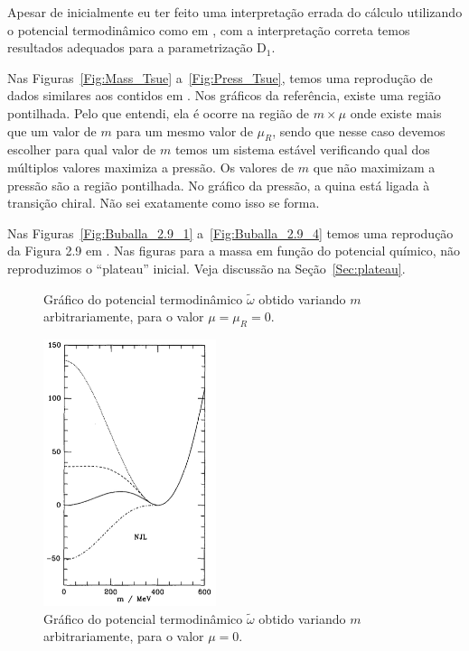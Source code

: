 Apesar de inicialmente eu ter feito uma interpretação errada do cálculo utilizando o potencial termodinâmico como em \textcite{Buballa1996}, com a interpretação correta temos resultados adequados para a parametrização D$_1$.

Nas Figuras~\ref{Fig:Mass_Tsue} a~\ref{Fig:Press_Tsue}, temos uma reprodução de dados similares aos contidos em \textcite{japoneses2}. Nos gráficos da referência, existe uma região pontilhada. Pelo que entendi, ela é ocorre na região de $m \times \mu$ onde existe mais que um valor de $m$ para um mesmo valor de $\mu_R$, sendo que nesse caso devemos escolher para qual valor de $m$ temos um sistema estável verificando qual dos múltiplos valores maximiza a pressão. Os valores de $m$ que não maximizam a pressão são a região pontilhada. No gráfico da pressão, a quina está ligada à transição chiral. Não sei exatamente como isso se forma.

Nas Figuras~\ref{Fig:Buballa_2.9_1} a~\ref{Fig:Buballa_2.9_4} temos uma reprodução da Figura 2.9 em \textcite{Buballa}. Nas figuras para a massa em função do potencial químico, não reproduzimos o ``plateau'' inicial. Veja discussão na Seção~\ref{Sec:plateau}.


\begin{figure}
	
	\caption{Gráfico do potencial termodinâmico $\tilde{\omega}$ obtido variando $m$ arbitrariamente, para o valor $\mu = \mu_R = 0$. \protect}
	\label{Fig:pot_term_analysys_NJL-Buballa_Set_1}
\end{figure}

\begin{figure}
	\centering
	\includegraphics[width=0.45\textwidth]{graphics/Therm_pot_analysis/Pot_buballa.png}
	\caption{Gráfico do potencial termodinâmico $\tilde{\omega}$ obtido variando $m$ arbitrariamente, para o valor $\mu = 0$.}
	\label{Fig:pot_term_analysys_Buballa_NJL-Buballa_Set_1}
\end{figure}

